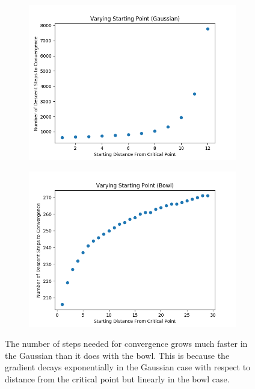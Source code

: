 \documentclass{article}
\begin{document}
\begin{figure}[H]
        \begin{subfigure}[b]{0.5\textwidth}
                \includegraphics[width=\linewidth]{../P1/figs/start_gauss.png}
        \end{subfigure}%
        \begin{subfigure}[b]{0.5\textwidth}
                \includegraphics[width=\linewidth]{../P1/figs/start_bowl.png}
        \end{subfigure}%
	\caption*{The number of steps needed for convergence grows much faster in the Gaussian than it does with the bowl. This is because the gradient decays exponentially in the Gaussian case with respect to distance from the critical point but linearly in the bowl case.}
\end{figure}
\end{document}
